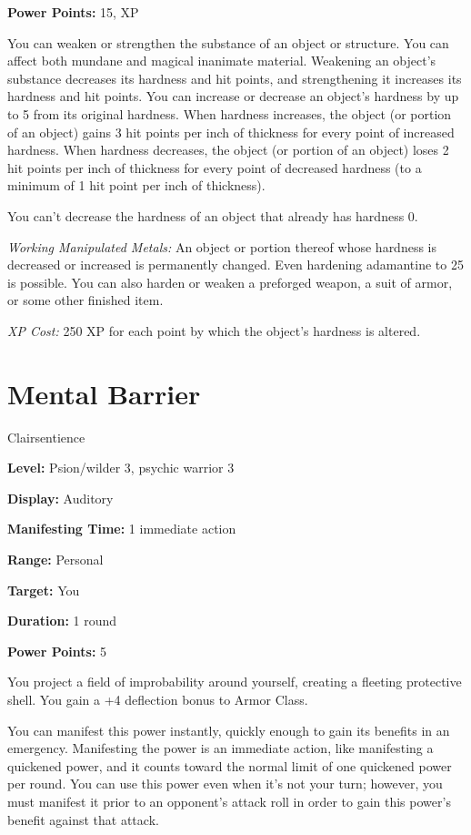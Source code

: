 \documentclass{article}
\begin{document}
\textbf{Power Points:} 15, XP

You can weaken or strengthen the substance of an object or structure. You can affect 
both mundane and magical inanimate material. Weakening an object's substance decreases 
its hardness and hit points, and strengthening it increases its hardness and hit 
points. You can increase or decrease an object's hardness by up to 5 from its original 
hardness. When hardness increases, the object (or portion of an object) gains 3 
hit points per inch of thickness for every point of increased hardness. When hardness 
decreases, the object (or portion of an object) loses 2 hit points per inch of 
thickness for every point of decreased hardness (to a minimum of 1 hit point per 
inch of thickness).

You can't decrease the hardness of an object that already has hardness 0.

\textit{Working Manipulated Metals: }An object or portion thereof whose hardness 
is decreased or increased is permanently changed. Even hardening adamantine to 
25 is possible. You can also harden or weaken a preforged weapon, a suit of armor, 
or some other finished item.

\textit{XP Cost: }250 XP for each point by which the object's hardness is altered.

\vspace{12pt}
\section*{Mental Barrier}

Clairsentience

\textbf{Level:} Psion/wilder 3, psychic warrior 3

\textbf{Display:} Auditory

\textbf{Manifesting Time:} 1 immediate action

\textbf{Range:} Personal

\textbf{Target:} You

\textbf{Duration:} 1 round

\textbf{Power Points:} 5

You project a field of improbability around yourself, creating a fleeting protective 
shell. You gain a +4 deflection bonus to Armor Class.

You can manifest this power instantly, quickly enough to gain its benefits in an 
emergency. Manifesting the power is an immediate action, like manifesting a quickened 
power, and it counts toward the normal limit of one quickened power per round. 
You can use this power even when it's not your turn; however, you must manifest 
it prior to an opponent's attack roll in order to gain this power's benefit against 
that attack.
\end{document}
